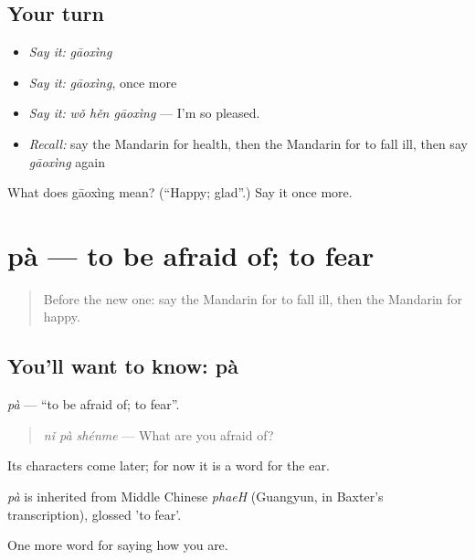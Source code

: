 \subsection*{Your turn}
\begin{itemize}
\raggedright
  \item \emph{Say it:} \emph{gāoxìng}
  \item \emph{Say it:} \emph{gāoxìng}, once more
  \item \emph{Say it:} \emph{wǒ hěn gāoxìng} — I'm so pleased.
  \item \emph{Recall:} say the Mandarin for health, then the Mandarin for to fall ill, then say \emph{gāoxìng} again
\end{itemize}

\begin{tcolorbox}[breakable,colback=teal!4,colframe=teal!35!black,title={Before you move on}]
What does gāoxìng mean? (\textquotedblleft{}Happy; glad\textquotedblright{}.) Say it once more.
\end{tcolorbox}
\section[pà]{pà — to be afraid of; to fear}

\label{lesson:ZH-C51-pa}



\begin{quote}
Before the new one: say the Mandarin for to fall ill, then the Mandarin for happy.
\end{quote}

\subsection*{You'll want to know: pà}
\emph{pà} — \textquotedblleft{}to be afraid of; to fear\textquotedblright{}.

\begin{quote}
\emph{nǐ pà shénme} — What are you afraid of?
\end{quote}

Its characters come later; for now it is a word for the ear.

\begin{cousinweb}
\emph{pà} is inherited from Middle Chinese \emph{phaeH} (Guangyun, in Baxter's transcription), glossed 'to fear'.
\end{cousinweb}

\begin{grammarlens}[title={What you've built}]
One more word for saying how you are.
\end{grammarlens}

